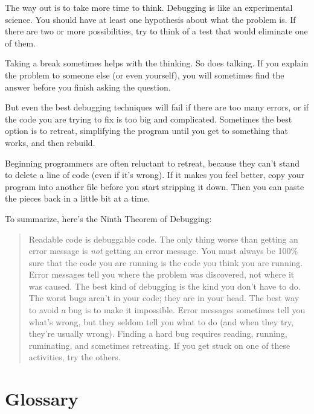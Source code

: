 \documentclass[
]{book}
\newcommand{\displaythrm}[1]{%
    \ifthenelse{\equal{#1}{1}}%
        {Readable code is debuggable code.}{%
    \ifthenelse{\equal{#1}{2}}%
        {The only thing worse than getting an error message is {\em
         not} getting an error message.}{%
    \ifthenelse{\equal{#1}{3}}%
        {You must always be 100\% sure that the code you are running
         is the code you think you are running.}{%
    \ifthenelse{\equal{#1}{4}}%
        {Error messages tell you where the problem was discovered,
         not where it was caused.}{%
    \ifthenelse{\equal{#1}{5}}%
        {The best kind of debugging is the kind you don't have to do.}{%
    \ifthenelse{\equal{#1}{6}}%
        {The worst bugs aren't in your code; they are in your head.}{%
    \ifthenelse{\equal{#1}{7}}%
        {The best way to avoid a bug is to make it impossible.}{%
    \ifthenelse{\equal{#1}{8}}%
        {Error messages sometimes tell you what's wrong, but they
         seldom tell you what to do (and when they try, they're usually
         wrong).}{%
    \ifthenelse{\equal{#1}{9}}%
        {Finding a hard bug requires reading, running, ruminating,
         and sometimes retreating.  If you get stuck on one of these
         activities, try the others.}{%
    {}%
}}}}}}}}}}%
\begin{document}
The way out is to take more time to think.  Debugging is like an
experimental science.  You should have at least one hypothesis about
what the problem is.  If there are two or more possibilities, try to
think of a test that would eliminate one of them.

Taking a break sometimes helps with the thinking.  So does talking.
If you explain the problem to someone else (or even yourself), you
will sometimes find the answer before you finish asking the question.

But even the best debugging techniques will fail if there are too many
errors, or if the code you are trying to fix is too big and
complicated.  Sometimes the best option is to retreat, simplifying the
program until you get to something that works, and then rebuild.

Beginning programmers are often reluctant to retreat, because
they can't stand to delete a line of code (even if it's wrong).
If it makes you feel better, copy your program into another file
before you start stripping it down.  Then you can paste the pieces
back in a little bit at a time.

To summarize, here's the Ninth Theorem of Debugging:

\begin{quote}
\displaythrm{9}
\end{quote}



\section{Glossary}
\end{document}
